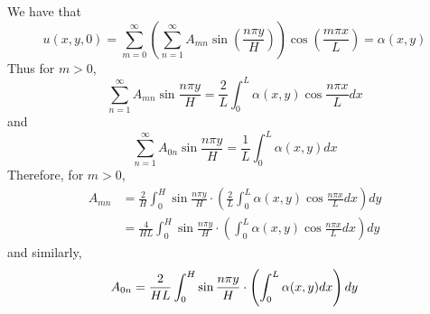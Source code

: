\documentclass[11pt]{article}
\theoremstyle{mystyle}
\theoremstyle{definition}
\begin{document}
We have that 
\[
  u(x,y,0) = \sum_{m=0}^\infty \left( \sum_{n=1}^\infty A_{mn} \sin\left(\displaystyle\frac{n\pi y}{H}\right) \right) \cos \left( \displaystyle\frac{m\pi x}{L}\right) = \alpha(x,y)
\]
Thus for $m > 0$,  
\[
  \sum_{n=1}^\infty A_{mn} \sin \displaystyle\frac{n\pi y}{H} = \displaystyle\frac{2}{L} \int_0^L \alpha(x,y) \cos \displaystyle\frac{n\pi x}{L} dx 
\]
and 
\[
  \sum_{n=1}^\infty A_{0n} \sin \displaystyle\frac{n\pi y}{H} = \displaystyle\frac{1}{L} \int_0^L \alpha(x,y) dx 
\]
Therefore, for $m>0$, 
\begin{align*}
  A_{mn} 
  &= \displaystyle\frac{2}{H} \int_0^H \sin \displaystyle\frac{n\pi y}{H} \cdot \left(  \displaystyle\frac{2}{L} \int_0^L \alpha(x,y) \cos \displaystyle\frac{n\pi x}{L} dx \right) dy \\
  &= \displaystyle\frac{4}{HL} \int_0^H \sin \displaystyle\frac{n\pi y}{H} \cdot \left( \int_0^L \alpha(x,y) \cos \displaystyle\frac{n\pi x}{L} dx \right) dy 
\end{align*}
and 
similarly, 
\[
  A_{0n} = \displaystyle\frac{2}{HL} \int_0^H \sin \displaystyle\frac{n\pi y}{H} \cdot \left( \int_0^L \alpha(x,y) dx \right) dy \\
\]
\newpage
\end{document}
